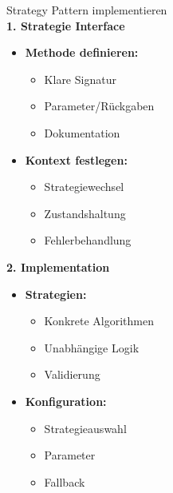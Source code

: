 \begin{KR}{Strategy Pattern implementieren}\\
\textbf{1. Strategie Interface}
\begin{itemize}
    \item \textbf{Methode definieren:}
    \begin{itemize}
        \item Klare Signatur
        \item Parameter/Rückgaben
        \item Dokumentation
    \end{itemize}
    
    \item \textbf{Kontext festlegen:}
    \begin{itemize}
        \item Strategiewechsel
        \item Zustandshaltung
        \item Fehlerbehandlung
    \end{itemize}
\end{itemize}

\textbf{2. Implementation}
\begin{itemize}
    \item \textbf{Strategien:}
    \begin{itemize}
        \item Konkrete Algorithmen
        \item Unabhängige Logik
        \item Validierung
    \end{itemize}
    
    \item \textbf{Konfiguration:}
    \begin{itemize}
        \item Strategieauswahl
        \item Parameter
        \item Fallback
    \end{itemize}
\end{itemize}
\end{KR}

